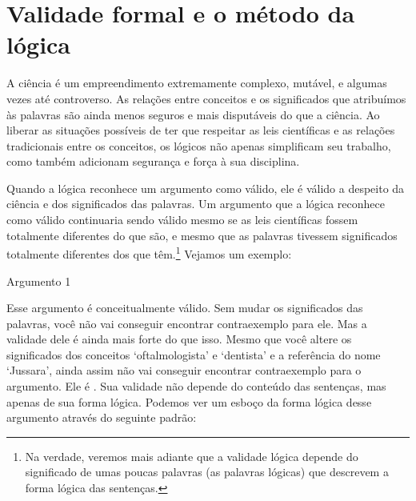 \section{Validade formal e o método da lógica}
A ciência é um empreendimento extremamente complexo, mutável, e algumas vezes até controverso. As relações entre conceitos e os significados que atribuímos às palavras são ainda menos seguros e mais disputáveis do que a ciência.
Ao liberar as situações possíveis de ter que respeitar as leis científicas e as relações tradicionais entre os conceitos, os lógicos não apenas simplificam seu trabalho, como também adicionam segurança e força à sua disciplina.

Quando a lógica reconhece um argumento como válido, ele é válido a despeito da ciência e dos significados das palavras.
Um argumento que a lógica reconhece como válido continuaria sendo válido mesmo se as leis científicas fossem totalmente diferentes do que são, e mesmo que as palavras tivessem significados totalmente diferentes dos que têm.\footnote{
	Na verdade, veremos mais adiante que a validade lógica depende do significado de umas poucas palavras (as palavras lógicas) que descrevem a forma lógica das sentenças.}
Vejamos um exemplo:
\begin{description}
\item[Argumento 1]
\end{description}
Esse argumento é conceitualmente válido.
Sem mudar os significados das palavras, você não vai conseguir encontrar contraexemplo para ele.
Mas a validade dele é ainda mais forte do que isso.
Mesmo que você altere os significados dos conceitos `oftalmologista' e `dentista' e a referência do nome `Jussara', ainda assim não vai conseguir encontrar contraexemplo para o argumento.
Ele é .
Sua validade não depende do conteúdo das sentenças, mas apenas de sua forma lógica.
Podemos ver um esboço da forma lógica desse argumento através do seguinte padrão:


